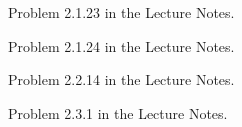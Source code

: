 
\begin{Sheet}
  \label{sheet3}
  
  \begin{Problem}
    Problem 2.1.23 in the Lecture Notes.
  \end{Problem}

  \begin{Problem}
  	Problem 2.1.24 in the Lecture Notes.
  \end{Problem}

  \begin{Problem}
  	Problem 2.2.14 in the Lecture Notes.
  \end{Problem}

  \begin{Problem}
  	Problem 2.3.1 in the Lecture Notes.
  \end{Problem}

\end{Sheet}



